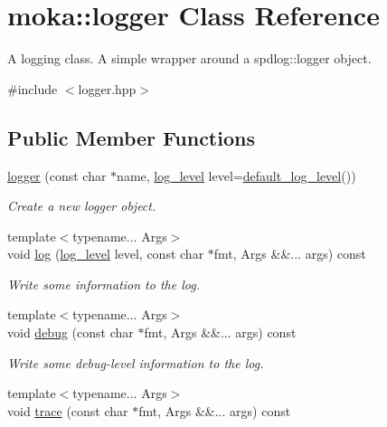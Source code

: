 \hypertarget{classmoka_1_1logger}{}\section{moka\+::logger Class Reference}
\label{classmoka_1_1logger}


A logging class. A simple wrapper around a spdlog\+::logger object.  




{\ttfamily \#include $<$logger.\+hpp$>$}

\subsection*{Public Member Functions}
\begin{DoxyCompactItemize}
\item 
\mbox{\hyperlink{classmoka_1_1logger_ab6da934b4b7a08e2734ffc09f9a49a55}{logger}} (const char $\ast$name, \mbox{\hyperlink{namespacemoka_a7c4111664aee7737c54ab37376b2637d}{log\+\_\+level}} level=\mbox{\hyperlink{namespacemoka_ac3f7b72250cd352011df4f431c862df5}{default\+\_\+log\+\_\+level}}())
\begin{DoxyCompactList}\small\item\em Create a new logger object. \end{DoxyCompactList}\item 
{\footnotesize template$<$typename... Args$>$ }\\void \mbox{\hyperlink{classmoka_1_1logger_a826aeeb2fcae75b99c72eb9c82b5fa13}{log}} (\mbox{\hyperlink{namespacemoka_a7c4111664aee7737c54ab37376b2637d}{log\+\_\+level}} level, const char $\ast$fmt, Args \&\&... args) const
\begin{DoxyCompactList}\small\item\em Write some information to the log. \end{DoxyCompactList}\item 
{\footnotesize template$<$typename... Args$>$ }\\void \mbox{\hyperlink{classmoka_1_1logger_ac8902f1eb4c4d77aad419dd765ccbac6}{debug}} (const char $\ast$fmt, Args \&\&... args) const
\begin{DoxyCompactList}\small\item\em Write some debug-\/level information to the log. \end{DoxyCompactList}\item 
{\footnotesize template$<$typename... Args$>$ }\\void \mbox{\hyperlink{classmoka_1_1logger_abf4c4a0e30d47e947737273084c4d531}{trace}} (const char $\ast$fmt, Args \&\&... args) const

\end{DoxyCompactItemize}

